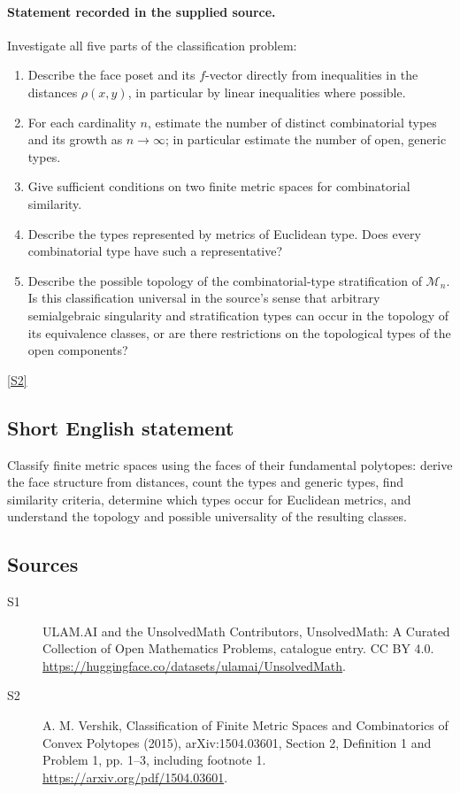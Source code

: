 \documentclass[11pt]{article}
\newcommand{\sref}[2]{\hyperlink{source:#1:#2}{[S#2]}}
\begin{document}
\paragraph{Statement recorded in the supplied source.}
Investigate all five parts of the classification problem:
\begin{enumerate}
\item Describe the face poset and its \(f\)-vector directly from inequalities in the distances \(\rho(x,y)\), in particular by linear inequalities where possible.
\item For each cardinality \(n\), estimate the number of distinct combinatorial types and its growth as \(n\to\infty\); in particular estimate the number of open, generic types.
\item Give sufficient conditions on two finite metric spaces for combinatorial similarity.
\item Describe the types represented by metrics of Euclidean type. Does every combinatorial type have such a representative?
\item Describe the possible topology of the combinatorial-type stratification of \(\mathcal M_n\). Is this classification universal in the source's sense that arbitrary semialgebraic singularity and stratification types can occur in the topology of its equivalence classes, or are there restrictions on the topological types of the open components?
\end{enumerate} \sref{statement}{2}
\subsection{Short English statement}
Classify finite metric spaces using the faces of their fundamental polytopes: derive the face structure from distances, count the types and generic types, find similarity criteria, determine which types occur for Euclidean metrics, and understand the topology and possible universality of the resulting classes.
\subsection{Sources}
\begin{description}
\item[\hypertarget{source:statement:1}{S1}] ULAM.AI and the UnsolvedMath Contributors, UnsolvedMath: A Curated Collection of Open Mathematics Problems, catalogue entry. CC BY 4.0. \url{https://huggingface.co/datasets/ulamai/UnsolvedMath}.
\item[\hypertarget{source:statement:2}{S2}] A. M. Vershik, Classification of Finite Metric Spaces and Combinatorics of Convex Polytopes (2015), arXiv:1504.03601, Section 2, Definition 1 and Problem 1, pp. 1–3, including footnote 1. \url{https://arxiv.org/pdf/1504.03601}.
\end{description}
\label{end:statement}
\end{document}
